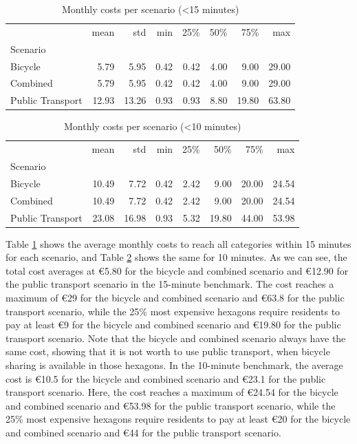 \begin{table}
  \caption{Monthly costs per scenario (<15 minutes)}
  \label{tab:monthly_costs_per_scenario_15}
  \begin{center}
    \begin{tabular}{lrrrrrrr}
     & mean & std & min & 25\% & 50\% & 75\% & max \\
    Scenario &  &  &  &  &  &  &  \\
    Bicycle & 5.79 & 5.95 & 0.42 & 0.42 & 4.00 & 9.00 & 29.00 \\
    Combined & 5.79 & 5.95 & 0.42 & 0.42 & 4.00 & 9.00 & 29.00 \\
    Public Transport & 12.93 & 13.26 & 0.93 & 0.93 & 8.80 & 19.80 & 63.80 \\
    \end{tabular}
  \end{center}
\end{table}


\begin{table}
  \caption{Monthly costs per scenario (<10 minutes)}
  \label{tab:monthly_costs_per_scenario_10}
  \begin{center}
    \begin{tabular}{lrrrrrrr}
     & mean & std & min & 25\% & 50\% & 75\% & max \\
    Scenario &  &  &  &  &  &  &  \\
    Bicycle & 10.49 & 7.72 & 0.42 & 2.42 & 9.00 & 20.00 & 24.54 \\
    Combined & 10.49 & 7.72 & 0.42 & 2.42 & 9.00 & 20.00 & 24.54 \\
    Public Transport & 23.08 & 16.98 & 0.93 & 5.32 & 19.80 & 44.00 & 53.98 \\
    \end{tabular}
  \end{center}
\end{table}

Table \ref{tab:monthly_costs_per_scenario_15} shows the average monthly costs to reach all categories within 15 minutes for each scenario, and Table \ref{tab:monthly_costs_per_scenario_10} shows the same for 10 minutes.
As we can see, the total cost averages at \euro{5.80} for the bicycle and combined scenario and \euro{12.90} for the public transport scenario in the 15-minute benchmark.
The cost reaches a maximum of \euro{29} for the bicycle and combined scenario and \euro{63.8} for the public transport scenario, while the 25\% most expensive hexagons require residents to pay at least \euro{9} for the bicycle and combined scenario and \euro{19.80} for the public transport scenario.
Note that the bicycle and combined scenario always have the same cost, showing that it is not worth to use public transport, when bicycle sharing is available in those hexagons.
In the 10-minute benchmark, the average cost is \euro{10.5} for the bicycle and combined scenario and \euro{23.1} for the public transport scenario.
Here, the cost reaches a maximum of \euro{24.54} for the bicycle and combined scenario and \euro{53.98} for the public transport scenario, while the 25\% most expensive hexagons require residents to pay at least \euro{20} for the bicycle and combined scenario and \euro{44} for the public transport scenario.

